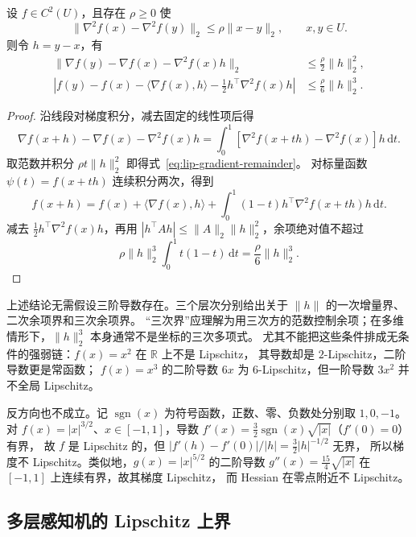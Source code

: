 \documentclass[UTF8,12pt,a4paper,fontset=fandol]{ctexart}
\begin{document}
\begin{theorem}[二阶近似的三次余项界]\label{thm:lip-hessian}
设 $f\in C^2(U)$，且存在 $\rho\ge0$ 使
\begin{equation}\label{eq:lip-hessian}
  \|\nabla^2 f(x)-\nabla^2 f(y)\|_2\le\rho\|x-y\|_2,\qquad x,y\in U.
\end{equation}
则令 $h=y-x$，有
\begin{align}
  \|\nabla f(y)-\nabla f(x)-\nabla^2 f(x)h\|_2
  &\le\frac{\rho}{2}\|h\|_2^2,\label{eq:lip-gradient-remainder}\\
  \left|f(y)-f(x)-\langle\nabla f(x),h\rangle
    -\frac12h^\top\nabla^2 f(x)h\right|
  &\le\frac{\rho}{6}\|h\|_2^3.\label{eq:lip-cubic-remainder}
\end{align}
\end{theorem}
\begin{proof}
沿线段对梯度积分，减去固定的线性项后得
\[
  \nabla f(x+h)-\nabla f(x)-\nabla^2f(x)h
  =\int_0^1[\nabla^2f(x+th)-\nabla^2f(x)]h\,\mathrm dt.
\]
取范数并积分 $\rho t\|h\|_2^2$ 即得式~\eqref{eq:lip-gradient-remainder}。
对标量函数 $\psi(t)=f(x+th)$ 连续积分两次，得到
\[
  f(x+h)=f(x)+\langle\nabla f(x),h\rangle
  +\int_0^1(1-t)h^\top\nabla^2f(x+th)h\,\mathrm dt.
\]
减去 $\tfrac12h^\top\nabla^2f(x)h$，再用
$|h^\top Ah|\le\|A\|_2\|h\|_2^2$，余项绝对值不超过
\[
  \rho\|h\|_2^3\int_0^1t(1-t)\,\mathrm dt
  =\frac{\rho}{6}\|h\|_2^3.
\]
\end{proof}

上述结论无需假设三阶导数存在。三个层次分别给出关于 $\|h\|$ 的一次增量界、二次余项界和三次余项界。
“三次界”应理解为用三次方的范数控制余项；在多维情形下，$\|h\|_2^3$ 本身通常不是坐标的三次多项式。
尤其不能把这些条件排成无条件的强弱链：$f(x)=x^2$ 在 $\mathbb R$ 上不是 Lipschitz，
其导数却是 $2$-Lipschitz，二阶导数更是常函数；
$f(x)=x^3$ 的二阶导数 $6x$ 为 $6$-Lipschitz，但一阶导数 $3x^2$ 并不全局 Lipschitz。

反方向也不成立。记 $\operatorname{sgn}(x)$ 为符号函数，正数、零、负数处分别取 $1,0,-1$。
对 $f(x)=|x|^{3/2}$、$x\in[-1,1]$，导数
$f'(x)=\tfrac32\operatorname{sgn}(x)\sqrt{|x|}$（$f'(0)=0$）有界，
故 $f$ 是 Lipschitz 的，但 $|f'(h)-f'(0)|/|h|=\tfrac32|h|^{-1/2}$ 无界，
所以梯度不 Lipschitz。类似地，$g(x)=|x|^{5/2}$ 的二阶导数
$g''(x)=\tfrac{15}{4}\sqrt{|x|}$ 在 $[-1,1]$ 上连续有界，故其梯度 Lipschitz，
而 Hessian 在零点附近不 Lipschitz。

\subsection{多层感知机的 Lipschitz 上界}
\label{subsec:lip-mlp}
\end{document}
